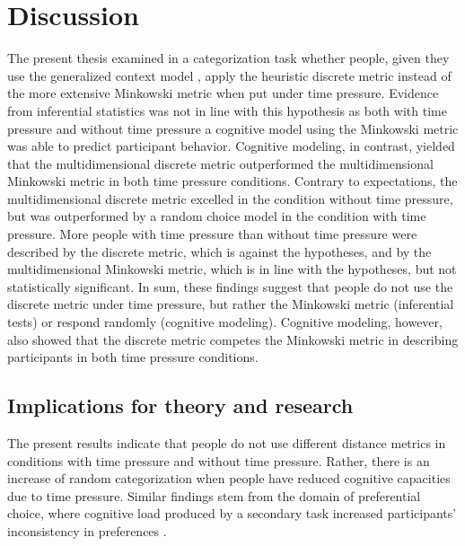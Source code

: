 \documentclass[a4paper,man,natbib]{apa6}
\begin{document}
\section{Discussion}
The present thesis examined in a categorization task whether people, given they use the generalized context model \citep{nosofsky1986attention}, apply the heuristic discrete metric instead of the more extensive Minkowski metric when put under time pressure. Evidence from inferential statistics was not in line with this hypothesis as both with time pressure and without time pressure a cognitive model using the Minkowski metric was able to predict participant behavior. Cognitive modeling, in contrast, yielded that the multidimensional discrete metric outperformed the multidimensional Minkowski metric in both time pressure conditions. Contrary to expectations, the multidimensional discrete metric excelled in the condition without time pressure, but was outperformed by a random choice model in the condition with time pressure. More people with time pressure than without time pressure were described by the discrete metric, which is against the hypotheses, and by the multidimensional Minkowski metric, which is in line with the hypotheses, but not statistically significant. In sum, these findings suggest that people do not use the discrete metric under time pressure, but rather the Minkowski metric (inferential tests) or respond randomly (cognitive modeling). Cognitive modeling, however, also showed that the discrete metric competes the Minkowski metric in describing participants in both time pressure conditions. 

\subsection{Implications for theory and research}
The present results indicate that people do not use different distance metrics in conditions with time pressure and without time pressure. Rather, there is an increase of random categorization when people have reduced cognitive capacities due to time pressure. Similar findings stem from the domain of preferential choice, where cognitive load produced by a secondary task increased participants' inconsistency in preferences \citep{olschewski2018taxing, burks2009cognitive}. 
\end{document}
